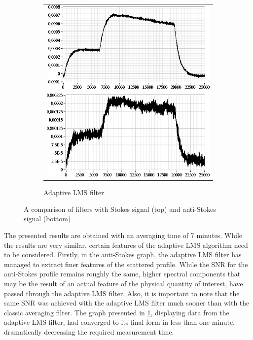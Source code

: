 \documentclass{standalone}
\begin{document}
\begin{figure}[h]
	\begin{subfigure}[b]{0.5\textwidth}
		\begin{tabular}{c}
			\includegraphics[width=\textwidth]{classic_lms_compare_stokes_lms.png} \vspace{1em} \\
			\includegraphics[width=\textwidth]{classic_lms_compare_antistokes_lms.png}
		\end{tabular}
		\caption{Adaptive LMS filter}
	\end{subfigure}
	\caption{A comparison of filters with Stokes signal (top) and anti-Stokes signal (bottom)}
	\label{fig:classic_lms_compare}
\end{figure}
The presented results are obtained with an averaging time of 7 minutes. While the results are very similar, certain features of the adaptive LMS algorithm need to be considered. Firstly, in the anti-Stokes graph, the adaptive LMS filter has managed to extract finer features of the scattered profile. While the SNR for the anti-Stokes profile remains roughly the same, higher spectral components that may be the result of an actual feature of the physical quantity of interest, have passed through the adaptive LMS filter. Also, it is important to note that the same SNR was achieved with the adaptive LMS filter much sooner than with the classic averaging filter. The graph presented in \ref{fig:classic_lms_compare}, displaying data from the adaptive LMS filter, had converged to its final form in less than one minute, dramatically decreasing the required measurement time. \\
\end{document}
